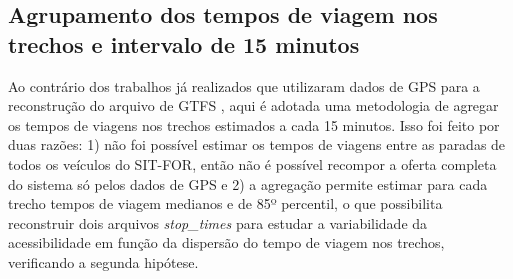 \documentclass[        
    a4paper,          %
    12pt,             %
    chapter=TITLE,    %
    section=Title,    %
    subsection=Title, %
    oneside,          %
    english,          %
    spanish,          %
    brazil,           %
    fleqn             %
]{abntex2}
\begin{document}
  \begin{figure}[!h]
  \captionsetup{width=16cm}
  \centering
  \end{figure}
  
  \hypertarget{agrupamento-dos-tempos-de-viagem-nos-trechos-e-intervalo-de-15-minutos}{%
  \subsection{Agrupamento dos tempos de viagem nos trechos e intervalo de 15 minutos}\label{agrupamento-dos-tempos-de-viagem-nos-trechos-e-intervalo-de-15-minutos}}
  
  Ao contrário dos trabalhos já realizados que utilizaram dados de GPS para a reconstrução do arquivo de GTFS \citep{Wessel2017}, aqui é adotada uma metodologia de agregar os tempos de viagens nos trechos estimados a cada 15 minutos. Isso foi feito por duas razões: 1) não foi possível estimar os tempos de viagens entre as paradas de todos os veículos do SIT-FOR, então não é possível recompor a oferta completa do sistema só pelos dados de GPS e 2) a agregação permite estimar para cada trecho tempos de viagem medianos e de 85º percentil, o que possibilita reconstruir dois arquivos \emph{stop\_times} para estudar a variabilidade da acessibilidade em função da dispersão do tempo de viagem nos trechos, verificando a segunda hipótese.
  
\end{document}
